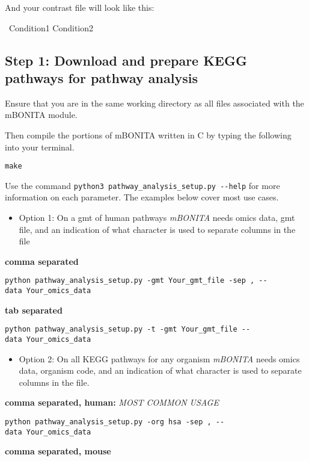 \documentclass[]{article}
\providecommand{\tightlist}{%
  \setlength{\itemsep}{0pt}\setlength{\parskip}{0pt}}
\begin{document}
And your contrast file will look like this:

~Condition1 \textbar{} Condition2 \textbar{}

\hypertarget{step-1-download-and-prepare-kegg-pathways-for-pathway-analysis}{%
\subsection{Step 1: Download and prepare KEGG pathways for pathway
analysis}\label{step-1-download-and-prepare-kegg-pathways-for-pathway-analysis}}

Ensure that you are in the same working directory as all files
associated with the mBONITA module.

Then compile the portions of mBONITA written in C by typing the
following into your terminal.

\texttt{make}

Use the command \texttt{python3\ pathway\_analysis\_setup.py\ -\/-help}
for more information on each parameter. The examples below cover most
use cases.

\begin{itemize}
\tightlist
\item
  Option 1: On a gmt of human pathways \emph{mBONITA} needs omics data,
  gmt file, and an indication of what character is used to separate
  columns in the file
\end{itemize}

\textbf{comma separated}

\texttt{python\ pathway\_analysis\_setup.py\ -gmt\ Your\_gmt\_file\ -sep\ ,\ -\/-data\ Your\_omics\_data}

\textbf{tab separated}

\texttt{python\ pathway\_analysis\_setup.py\ -t\ -gmt\ Your\_gmt\_file\ -\/-data\ Your\_omics\_data}

\begin{itemize}
\tightlist
\item
  Option 2: On all KEGG pathways for any organism \emph{mBONITA} needs
  omics data, organism code, and an indication of what character is used
  to separate columns in the file.
\end{itemize}

\textbf{comma separated, human:} \emph{MOST COMMON USAGE}

\texttt{python\ pathway\_analysis\_setup.py\ -org\ hsa\ -sep\ ,\ -\/-data\ Your\_omics\_data}

\textbf{comma separated, mouse}
\end{document}
